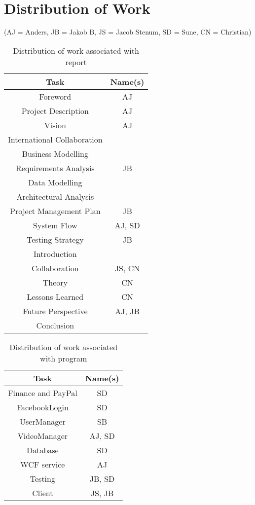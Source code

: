 \section{Distribution of Work}
\label{Distribution of Work}
(AJ = Anders, JB = Jakob B, JS = Jacob Stenum, SD = Sune, CN = Christian)\\
\begin{table}[H]
\caption{Distribution of work associated with report}
\centering

\begin{tabular}{c c}
Task & Name(s) \\ [1.5ex] 
\hline
Foreword & AJ \\
Project Description & AJ \\
Vision & AJ\\
International Collaboration & \\
Business Modelling & \\
Requirements Analysis & JB\\
Data Modelling & \\
Architectural Analysis & \\
Project Management Plan & JB \\
System Flow & AJ, SD\\
Testing Strategy & JB\\
Introduction & \\
Collaboration & JS, CN \\
Theory & CN \\
Lessons Learned & CN\\
Future Perspective & AJ, JB \\
Conclusion & \\

\end{tabular}
\end{table}

\begin{table}[H]
\caption{Distribution of work associated with program}
\centering
\begin{tabular}{c c}
Task & Name(s)\\ [1.5ex] 
\hline
Finance and PayPal & SD \\
FacebookLogin & SD \\
UserManager & SB \\
VideoManager & AJ, SD \\
Database & SD \\
WCF service & AJ\\
Testing & JB, SD \\
Client & JS, JB\\


\end{tabular}
\end{table}

